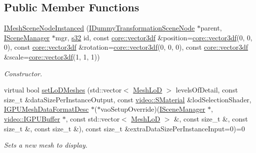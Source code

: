 \subsection*{Public Member Functions}
\begin{DoxyCompactItemize}
\item 
\hyperlink{classirr_1_1scene_1_1IMeshSceneNodeInstanced_a2aa6f622516a2b0f541d279fa8996247}{I\+Mesh\+Scene\+Node\+Instanced} (\hyperlink{classirr_1_1scene_1_1IDummyTransformationSceneNode}{I\+Dummy\+Transformation\+Scene\+Node} $\ast$parent, \hyperlink{classirr_1_1scene_1_1ISceneManager}{I\+Scene\+Manager} $\ast$mgr, \hyperlink{namespaceirr_ac66849b7a6ed16e30ebede579f9b47c6}{s32} id, const \hyperlink{namespaceirr_1_1core_a06f169d08b5c429f5575acb7edbad811}{core\+::vector3df} \&position=\hyperlink{namespaceirr_1_1core_a06f169d08b5c429f5575acb7edbad811}{core\+::vector3df}(0, 0, 0), const \hyperlink{namespaceirr_1_1core_a06f169d08b5c429f5575acb7edbad811}{core\+::vector3df} \&rotation=\hyperlink{namespaceirr_1_1core_a06f169d08b5c429f5575acb7edbad811}{core\+::vector3df}(0, 0, 0), const \hyperlink{namespaceirr_1_1core_a06f169d08b5c429f5575acb7edbad811}{core\+::vector3df} \&scale=\hyperlink{namespaceirr_1_1core_a06f169d08b5c429f5575acb7edbad811}{core\+::vector3df}(1, 1, 1))
\begin{DoxyCompactList}\small\item\em Constructor. \end{DoxyCompactList}\item 
virtual bool \hyperlink{classirr_1_1scene_1_1IMeshSceneNodeInstanced_a01d0dca01d9c058ee4c907ddf617211c}{set\+Lo\+D\+Meshes} (std\+::vector$<$ \hyperlink{structirr_1_1scene_1_1IMeshSceneNodeInstanced_1_1MeshLoD}{Mesh\+LoD} $>$ levels\+Of\+Detail, const size\+\_\+t \&data\+Size\+Per\+Instance\+Output, const \hyperlink{classirr_1_1video_1_1SMaterial}{video\+::\+S\+Material} \&lod\+Selection\+Shader, \hyperlink{classirr_1_1scene_1_1IMeshDataFormatDesc}{I\+G\+P\+U\+Mesh\+Data\+Format\+Desc} $\ast$($\ast$vao\+Setup\+Override)(\hyperlink{classirr_1_1scene_1_1ISceneManager}{I\+Scene\+Manager} $\ast$, \hyperlink{classirr_1_1video_1_1IGPUBuffer}{video\+::\+I\+G\+P\+U\+Buffer} $\ast$, const std\+::vector$<$ \hyperlink{structirr_1_1scene_1_1IMeshSceneNodeInstanced_1_1MeshLoD}{Mesh\+LoD} $>$ \&, const size\+\_\+t \&, const size\+\_\+t \&, const size\+\_\+t \&), const size\+\_\+t \&extra\+Data\+Size\+Per\+Instance\+Input=0)=0
\begin{DoxyCompactList}\small\item\em Sets a new mesh to display. \end{DoxyCompactList}\item 

\end{DoxyCompactItemize}
